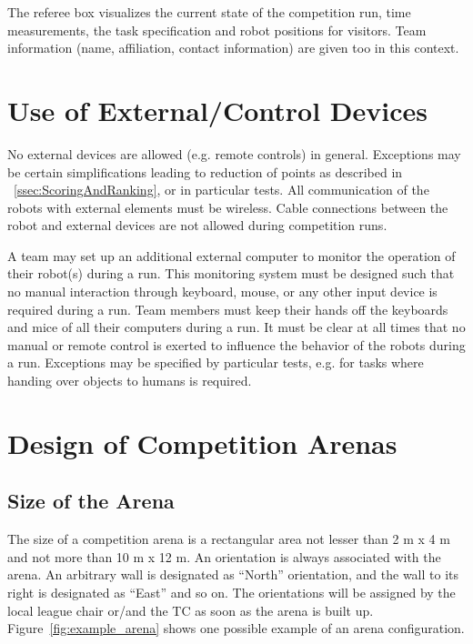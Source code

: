\par
The referee box visualizes the current state of the competition run,  time measurements, the task specification and robot positions for visitors. Team information (name, affiliation, contact information) are given too in this context.


\section{Use of External/Control Devices}
No external devices are allowed (e.g. remote controls) in general. Exceptions may be certain simplifications leading to reduction of points as described in ~\ref{ssec:ScoringAndRanking}, or in particular tests. All communication of the robots with external elements must be wireless. Cable connections between the robot and external devices are not allowed during competition runs.
\par
A team may set up an additional external computer to monitor the operation of their robot(s) during a run. This monitoring system must be designed such that no manual interaction through keyboard, mouse, or any other input device is required during a run. Team members must keep their hands off the keyboards and mice of all their computers during a run.
It must be clear at all times that no manual or remote control is exerted to influence the behavior of the robots during a run. Exceptions may be specified by particular tests, e.g. for tasks where handing over objects to humans is required.

\section{Design of Competition Arenas}
\label{sec:ArenaDesign}
\subsection{Size of the Arena}

The size of a competition arena is a rectangular area not lesser than 2 m x 4 m and not more than 10 m x 12 m.
An orientation is always associated with the arena. An arbitrary wall is designated as “North” orientation, and the wall to its right is designated as “East” and so on. The orientations will be assigned by the local league chair or/and the TC as soon as the arena is built up. Figure~\ref{fig:example_arena} shows one possible example of an arena configuration.

